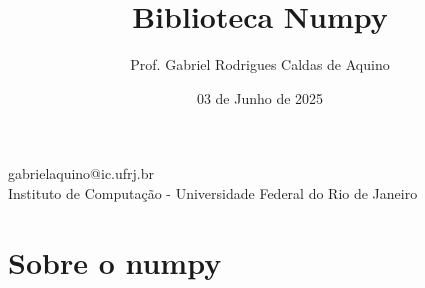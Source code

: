 
\title{Biblioteca Numpy}

\author{Prof. Gabriel Rodrigues Caldas de Aquino}

\institute
{
    gabrielaquino@ic.ufrj.br\\
    
    Instituto de Computação -
    Universidade Federal do Rio de Janeiro %
}
\date{03 de Junho de 2025} %



\begin{frame}
    \titlepage
\end{frame}

\section{Sobre o numpy}

